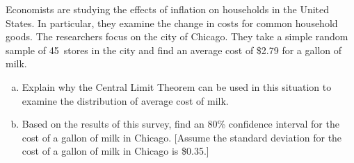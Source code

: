 \documentclass[12pt,letterpaper]{exam}
\begin{document}
\begin{questions}
\newpage
\question[10] Economists are studying the effects of inflation on households in the United States. In particular, they examine the change in costs for common household goods. The researchers focus on the city of Chicago. They take a simple random sample of 45~stores in the city and find an average cost of \$2.79 for a gallon of milk. 
\begin{enumerate}[(a)]
\item Explain why the Central Limit Theorem can be used in this situation to examine the distribution of average cost of milk. 
\item Based on the results of this survey, find an 80\% confidence interval for the cost of a gallon of milk in Chicago. [Assume the standard deviation for the cost of a gallon of milk in Chicago is \$0.35.]
\end{enumerate}


\end{questions}
\end{document}
